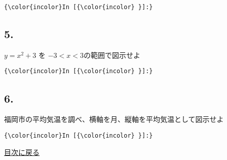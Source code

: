 \documentclass[a4paper,dvipdfmx,uplatex]{jsarticle}
\begin{document}
    \begin{Verbatim}[commandchars=\\\{\}]
{\color{incolor}In [{\color{incolor} }]:} 
\end{Verbatim}

    \subsection{5.}\label{section}

\(y = x^2 + 3\) を \(-3 < x < 3\)の範囲で図示せよ

    \begin{Verbatim}[commandchars=\\\{\}]
{\color{incolor}In [{\color{incolor} }]:} 
\end{Verbatim}

    \subsection{6.}\label{section}

福岡市の平均気温を調べ、横軸を月、縦軸を平均気温として図示せよ

    \begin{Verbatim}[commandchars=\\\{\}]
{\color{incolor}In [{\color{incolor} }]:} 
\end{Verbatim}

    \protect\hyperlink{ux76eeux6b21}{目次に戻る}


    
    
    
    
\end{document}
